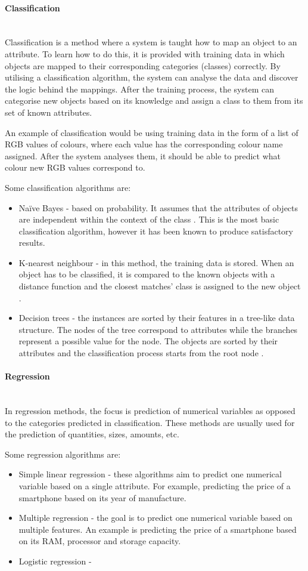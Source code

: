 \documentclass[12pt,a4paper]{article}
\newcommand{\myparagraph}[1]{\paragraph{#1}\mbox{}\\}
\begin{document}
\myparagraph{Classification}
Classification is a method where a system is taught how to map an object to an attribute. To learn how to do this, it is provided with training data in which objects are mapped to their corresponding categories (classes) correctly. By utilising a classification algorithm, the system can analyse the data and discover the logic behind the mappings. After the training process, the system can categorise new objects based on its knowledge and assign a class to them from its set of known attributes. 

An example of classification would be using training data in the form of a list of RGB values of colours, where each value has the corresponding colour name assigned. After the system analyses them, it should be able to predict what colour new RGB values correspond to. 

Some classification algorithms are:
\begin{itemize}
	\item Na\"ive Bayes - based on probability. It assumes that the attributes of objects are independent within the context of the class \citep{mccallum1998comparison}. This is the most basic classification algorithm, however it has been known to produce satisfactory results.
	\item K-nearest neighbour - in this method, the training data is stored. When an object has to be classified, it is compared to the known objects with a distance function and the closest matches' class is assigned to the new object \citep{Kononenko2007}.
	\item Decision trees - the instances are sorted by their features in a tree-like data structure. The nodes of the tree correspond to attributes while the branches represent a possible value for the node. The objects are sorted by their attributes and the classification process starts from the root node \citep{Kotsiantis2007}.
\end{itemize}

\myparagraph{Regression}
In regression methods, the focus is prediction of numerical variables as opposed to the categories predicted in classification. These methods are usually used for the prediction of quantities, sizes, amounts, etc.

Some regression algorithms are:
\begin{itemize}
	\item Simple linear regression - these algorithms aim to predict one numerical variable based on a single attribute. For example, predicting the price of a smartphone based on its year of manufacture.
	\item Multiple regression - the goal is to predict one numerical variable based on multiple features. An example is predicting the price of a smartphone based on its RAM, processor and storage capacity.
	\item Logistic regression - 
\end{itemize}
\end{document}
